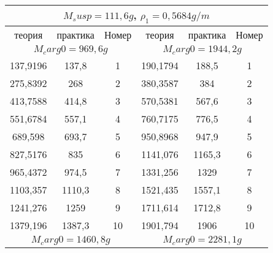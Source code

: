 \documentclass[a4paper, 12pt]{article}%
\begin{document}
\begin{enumerate}
\begin{center}
\begin{tabular}{|c|c|c|ccc}
\hline
\multicolumn{6}{|c|}{$M_susp = 111,6 g$, $\rho_1 = 0,5684 g/m$}                                                                           \\ \hline
теория          & практика       & Номер     & \multicolumn{1}{c|}{теория}   & \multicolumn{1}{c|}{практика} & \multicolumn{1}{c|}{Номер} \\ \hline
\multicolumn{3}{|c|}{$M_carg0 = 969,6 g$}    & \multicolumn{3}{c|}{$M_carg0 =  1944,2 g$}                                                 \\ \hline
137,9196        & 137,8          & 1         & \multicolumn{1}{c|}{190,1794} & \multicolumn{1}{c|}{188,5}    & \multicolumn{1}{c|}{1}     \\ \hline
275,8392        & 268            & 2         & \multicolumn{1}{c|}{380,3587} & \multicolumn{1}{c|}{384}      & \multicolumn{1}{c|}{2}     \\ \hline
413,7588        & 414,8          & 3         & \multicolumn{1}{c|}{570,5381} & \multicolumn{1}{c|}{567,6}    & \multicolumn{1}{c|}{3}     \\ \hline
551,6784        & 557,1          & 4         & \multicolumn{1}{c|}{760,7175} & \multicolumn{1}{c|}{776,5}    & \multicolumn{1}{c|}{4}     \\ \hline
689,598         & 693,7          & 5         & \multicolumn{1}{c|}{950,8968} & \multicolumn{1}{c|}{947,9}    & \multicolumn{1}{c|}{5}     \\ \hline
827,5176        & 835            & 6         & \multicolumn{1}{c|}{1141,076} & \multicolumn{1}{c|}{1165,3}   & \multicolumn{1}{c|}{6}     \\ \hline
965,4372        & 974,5          & 7         & \multicolumn{1}{c|}{1331,256} & \multicolumn{1}{c|}{1329}     & \multicolumn{1}{c|}{7}     \\ \hline
1103,357        & 1110,3         & 8         & \multicolumn{1}{c|}{1521,435} & \multicolumn{1}{c|}{1557,1}   & \multicolumn{1}{c|}{8}     \\ \hline
1241,276        & 1259           & 9         & \multicolumn{1}{c|}{1711,614} & \multicolumn{1}{c|}{1712,8}   & \multicolumn{1}{c|}{9}     \\ \hline
1379,196        & 1387,3         & 10        & \multicolumn{1}{c|}{1901,794} & \multicolumn{1}{c|}{1906}     & \multicolumn{1}{c|}{10}    \\ \hline
\multicolumn{3}{|c|}{$M_carg0 = 1460,8 g$}   & \multicolumn{3}{c|}{$M_carg0 =  2281,1 g$}                                                 \\ \hline

\end{tabular}
\end{center}
\end{enumerate}
\end{document}
